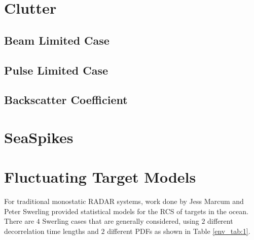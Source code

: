 \section{Clutter}
\subsection{Beam Limited Case}
\subsection{Pulse Limited Case}
\subsection{Backscatter Coefficient}

\section{SeaSpikes}

\section{Fluctuating Target Models}
For traditional monostatic RADAR systems, work done by Jess Marcum and Peter Swerling provided statistical models for the RCS of targets in the ocean\cite{richards_radar}. There are $4$ Swerling cases that are generally considered, using $2$ different decorrelation time lengths and $2$ different PDFs as shown in Table \ref{env_tab:1}. 

